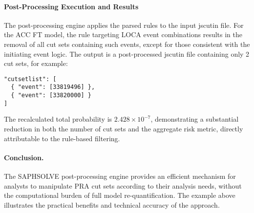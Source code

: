 \paragraph{Post-Processing Execution and Results}

The post-processing engine applies the parsed rules to the input \acrshort{jscutin} file. For the ACC FT model, the rule targeting LOCA event combinations results in the removal of all cut sets containing such events, except for those consistent with the initiating event logic. The output is a post-processed \acrshort{jscutin} file containing only 2 cut sets, for example:
\begin{verbatim}
"cutsetlist": [
  { "event": [33819496] },
  { "event": [33820000] }
]
\end{verbatim}
The recalculated total probability is $2.428 \times 10^{-7}$, demonstrating a substantial reduction in both the number of cut sets and the aggregate risk metric, directly attributable to the rule-based filtering.

\paragraph{Conclusion.} The SAPHSOLVE post-processing engine provides an efficient mechanism for analysts to manipulate PRA cut sets according to their analysis needs, without the computational burden of full model re-quantification. The example above illustrates the practical benefits and technical accuracy of the approach.
